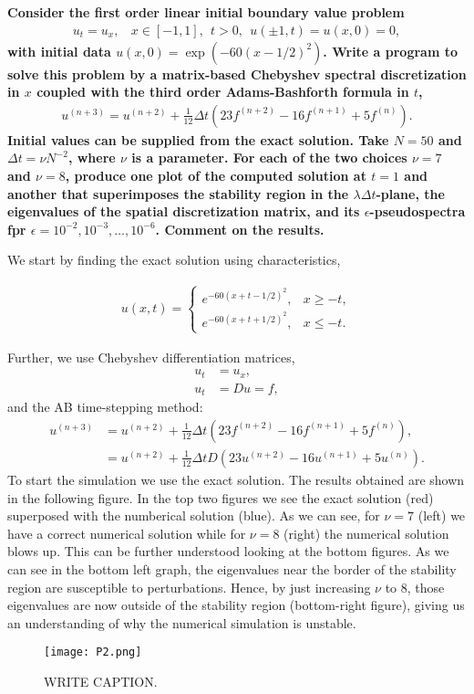 \textbf{Consider the first order linear initial boundary value problem
\begin{align*}
u_t=u_x, ~~~~x\in[-1,1],~~t>0,~~u(\pm 1,t)=u(x,0)=0,
\end{align*}
with initial data $u(x,0) = \exp(-60(x-1/2)^2)$. Write a program to solve this problem by a matrix-based Chebyshev spectral discretization in $x$ coupled with the third order Adams-Bashforth formula in $t$, 
\begin{align*}
u^{(n+3)} = u^{(n+2)}+\frac{1}{12}\Delta t\left(23f^{(n+2)}-16f^{(n+1)}+5f^{(n)}\right).
\end{align*}
Initial values can be supplied from the exact solution. Take $N=50$ and \newline $\Delta t=\nu N^{-2}$, where $\nu$ is a parameter. For each of the two choices $\nu = 7$ and $\nu = 8$, produce one plot of the computed solution at $t=1$ and another that superimposes the stability region in the $\lambda\Delta t$-plane, the eigenvalues of the spatial discretization matrix, and its $\epsilon$-pseudospectra fpr $\epsilon=10^{-2},10^{-3},\dots,10^{-6}$. Comment on the results.
}
\newline

We start by finding the exact solution using characteristics,

\begin{align*}
u(x,t) = 
\begin{cases}
       e^{-60(x+t-1/2)^2},& x\geq -t,\\
       e^{-60(x+t+1/2)^2},& x\leq -t.
\end{cases}
\end{align*}

Further, we use Chebyshev differentiation matrices,
\begin{align*}
u_t &= u_x,\\
u_t &= Du = f,
\end{align*}
and the AB time-stepping method:
\begin{align*}
u^{(n+3)} &= u^{(n+2)}+\frac{1}{12}\Delta t\left(23f^{(n+2)}-16f^{(n+1)}+5f^{(n)}\right),\\
&= u^{(n+2)}+\frac{1}{12}\Delta tD\left(23u^{(n+2)}-16u^{(n+1)}+5u^{(n)}\right).
\end{align*}
To start the simulation we use the exact solution. The results obtained are shown in the following figure. In the top two figures we see the exact solution (red) superposed with the numberical solution (blue). As we can see, for $\nu=7$ (left) we have a correct numerical solution while for $\nu=8$ (right) the numerical solution blows up. This can be further understood looking at the bottom figures. As we can see in the bottom left graph, the eigenvalues near the border of the stability region are susceptible to perturbations. Hence, by just increasing $\nu$ to 8, those eigenvalues are now outside of the stability region (bottom-right figure), giving us an understanding of why the numerical simulation is unstable.
\begin{figure}[H]
\centering
\texttt{[image: P2.png]}\caption{WRITE CAPTION.}
\end{figure}

